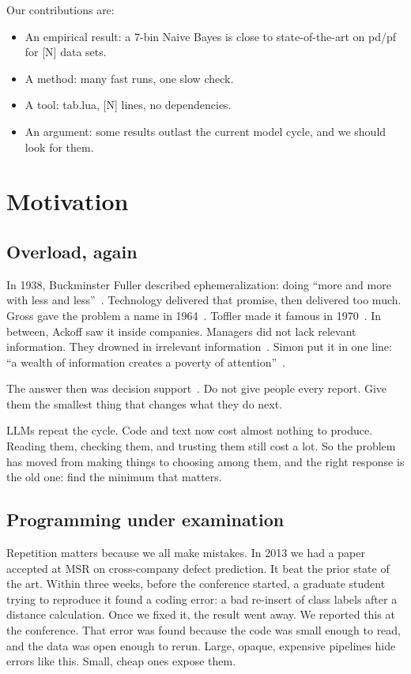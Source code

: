 \documentclass[AMA,STIX2COL]{WileyNJD-v2}
\begin{document}
Our contributions are:
\begin{itemize}
\item An empirical result: a 7-bin Naive Bayes is close to
  state-of-the-art on pd/pf for [N] data sets.
\item A method: many fast runs, one slow check.
\item A tool: tab.lua, [N] lines, no dependencies.
\item An argument: some results outlast the current model cycle, and
  we should look for them.
\end{itemize}

\section{Motivation}

\subsection{Overload, again}

In 1938, Buckminster Fuller described ephemeralization: doing ``more
and more with less and less''~\cite{fuller1938nine}.  Technology
delivered that promise, then delivered too much.  Gross gave the
problem a name in 1964~\cite{gross1964managing}.  Toffler made it
famous in 1970~\cite{toffler1970future}.  In between, Ackoff saw it
inside companies.  Managers did not lack relevant information.  They
drowned in irrelevant information~\cite{ackoff1967misinformation}.
Simon put it in one line: ``a wealth of information creates a poverty
of attention''~\cite{simon1971designing}.

The answer then was decision support~\cite{gorry1971framework}.  Do
not give people every report.  Give them the smallest thing that
changes what they do next.

LLMs repeat the cycle.  Code and text now cost almost nothing to
produce.  Reading them, checking them, and trusting them still cost a
lot.  So the problem has moved from making things to choosing among
them, and the right response is the old one: find the minimum that
matters.

\subsection{Programming under examination}

Repetition matters because we all make mistakes.  In 2013 we had a
paper accepted at MSR on cross-company defect prediction.  It beat
the prior state of the art.  Within three weeks, before the
conference started, a graduate student trying to reproduce it found a
coding error: a bad re-insert of class labels after a distance
calculation.  Once we fixed it, the result went away.  We reported
this at the conference.  That error was found because the code was
small enough to read, and the data was open enough to rerun.  Large,
opaque, expensive pipelines hide errors like this.  Small, cheap ones
expose them.
\end{document}

